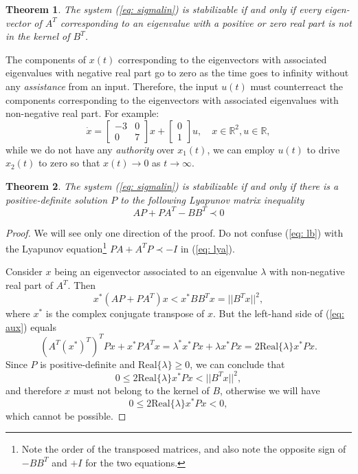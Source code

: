 \documentclass[11pt,a4paper,titlepage]{article}
\newtheorem{theorem}{Theorem}
\begin{document}
\begin{theorem}
The system (\ref{eq: sigmalin}) is stabilizable if and only if every eigen-vector of $A^T$ corresponding to an eigenvalue with a positive or zero real part is not in the kernel of $B^T$.
\end{theorem}

The components of $x(t)$ corresponding to the eigenvectors with associated eigenvalues with negative real part go to zero as the time goes to infinity without any \emph{assistance} from an input. Therefore, the input $u(t)$ must counterreact the components corresponding to the eigenvectors with associated eigenvalues with non-negative real part. For example:
\begin{equation}
	\dot x = \begin{bmatrix}-3 & 0 \\ 0 & 7\end{bmatrix}x + \begin{bmatrix}0 \\ 1\end{bmatrix}u, \quad x\in\mathbb{R}^2, u\in\mathbb{R},
\end{equation}
while we do not have any \emph{authority} over $x_1(t)$, we can employ $u(t)$ to drive $x_2(t)$ to zero so that $x(t)\to 0$ as $t\to\infty$.
\begin{theorem}
	The system (\ref{eq: sigmalin}) is stabilizable if and only if there is a positive-definite solution $P$ to the following Lyapunov matrix inequality
	\begin{equation}
	AP + PA^T - BB^T \prec 0
		\label{eq: lb}
	\end{equation}
\end{theorem}
\begin{proof}
	We will see only one direction of the proof. Do not confuse (\ref{eq: lb}) with the Lyapunov equation\footnote{Note the order of the transposed matrices, and also note the opposite sign of $-BB^T$ and $+I$ for the two equations.} $PA+A^TP \prec -I$ in (\ref{eq: lya}).


Consider $x$ being an eigenvector associated to an eigenvalue $\lambda$ with non-negative real part of $A^T$. Then
	\begin{equation}
	x^*(AP+PA^T)x < x^*BB^Tx = ||B^Tx||^2,
		\label{eq: aux}
	\end{equation}
	where $x^*$ is the complex conjugate transpose of $x$. But the left-hand side of (\ref{eq: aux}) equals
	\begin{equation}
		(A^T(x^*)^T)^TPx + x^*PA^Tx = \lambda^*x^*Px + \lambda x^*Px = 2\text{Real}\{\lambda\}x^*Px.
	\end{equation}
	Since $P$ is positive-definite and $\text{Real}\{\lambda\} \geq 0$, we can conclude that
\begin{equation}
0 \leq 2\text{Real}\{\lambda\}x^*Px < ||B^Tx||^2,
\end{equation}
and therefore $x$ must not belong to the kernel of $B$, otherwise we will have
\begin{equation}
0 \leq 2\text{Real}\{\lambda\}x^*Px < 0,
\end{equation}
which cannot be possible.
\end{proof}
\end{document}
